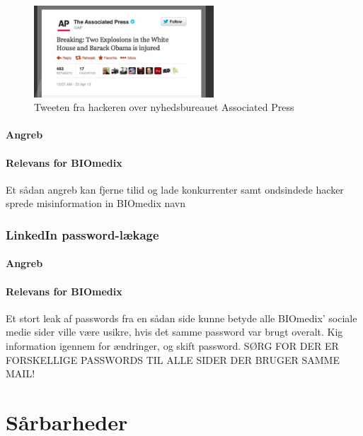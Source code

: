 \documentclass{article}
\begin{document}
\begin{figure}
  \begin{center}
    \includegraphics[width=0.6\textwidth]{../Pictures/APTweet.jpg}
  \end{center}
  \caption{Tweeten fra hackeren over nyhedsbureauet Associated Press \cite{APTweetSource}}
\end{figure}

\paragraph{Angreb}
 
\paragraph{Relevans for BIOmedix}

Et sådan angreb kan fjerne tilid og lade konkurrenter samt ondsindede hacker sprede misinformation in BIOmedix navn 
\subsubsection{LinkedIn password-lækage}

\paragraph{Angreb}

\paragraph{Relevans for BIOmedix}

Et stort leak af passwords fra en sådan side kunne betyde alle BIOmedix' sociale medie sider ville være usikre, hvis det samme password var brugt overalt. Kig information igennem for ændringer, og skift password. SØRG FOR DER ER FORSKELLIGE PASSWORDS TIL ALLE SIDER DER BRUGER SAMME MAIL! 

\section{Sårbarheder}
\end{document}
